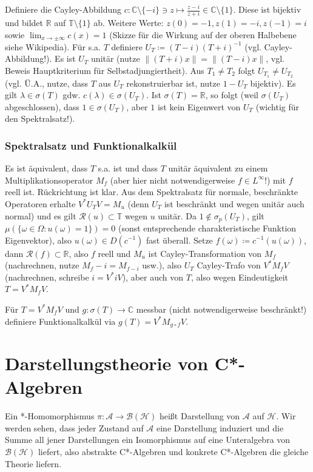 \documentclass[11pt,a4paper]{scrartcl}
\newcommand{\R}{\mathbb{R}} %
\newcommand{\C}{\mathbb{C}} %
\newcommand{\Hc}{\mathcal{H}}
\newcommand{\A}{\mathcal{A}}
\newcommand{\B}{\mathcal{B}}
\newcommand{\Rc}{\mathcal{R}}
\theoremstyle{plain}
\theoremstyle{definition}
\theoremstyle{remark}
\begin{document}
Definiere die Cayley-Abbildung $c: \C\setminus \{-i\} \ni z \mapsto \frac{z-i}{z+i} \in \C\setminus \{1\}$. Diese ist bijektiv und bildet $\R$ auf $\mathbb{T} \setminus \{1\}$ ab. Weitere Werte: $z(0)=-1, z(1)=-i, z(-1)=i$ sowie $\lim_{x\to \pm \infty} c(x) = 1$ (Skizze für die Wirkung auf der oberen Halbebene siehe Wikipedia). Für s.a. $T$ definiere $U_T\coloneqq (T-i)(T+i)^{-1}$ (vgl. Cayley-Abbildung!). Es ist $U_T$ unitär (nutze $\|(T+i)x\|=\|(T-i)x\|$, vgl. Beweis Hauptkriterium für Selbstadjungiertheit). Aus $T_1\neq T_2$ folgt $U_{T_1}\neq U_{T_2}$ (vgl. Ü.A., nutze, dass $T$ aus $U_T$ rekonstruierbar ist, nutze $1-U_T$ bijektiv). Es gilt $\lambda\in \sigma(T)$ gdw. $c(\lambda)\in \sigma(U_T)$. Ist $\sigma(T)=\R$, so folgt (weil $\sigma(U_T)$ abgeschlossen), dass $1\in \sigma(U_T)$, aber $1$ ist kein Eigenwert von $U_T$ (wichtig für den Spektralsatz!).

\subsubsection{Spektralsatz und Funktionalkalkül}

Es ist äquivalent, dass $T$ s.a. ist und dass $T$ unitär äquivalent zu einem Multiplikationsoperator $M_f$ (aber hier nicht notwendigerweise $f\in L^\infty$!) mit $f$ reell ist. Rückrichtung ist klar. Aus dem Spektralsatz für normale, beschränkte Operatoren erhalte $V^*U_TV=M_u$ (denn $U_T$ ist beschränkt und wegen unitär auch normal) und es gilt $\Rc(u)\subset \mathbb T$ wegen $u$ unitär. Da $1\not\in \sigma_p(U_T)$, gilt $\mu(\{\omega\in \Omega: u(\omega)=1\})=0$ (sonst entsprechende charakteristische Funktion Eigenvektor), also $u(\omega)\in D(c^{-1})$ fast überall. Setze $f(\omega)\coloneqq c^{-1}(u(\omega))$, dann $\Rc(f) \subset \R$, also $f$ reell und $M_u$ ist Cayley-Transformation von $M_f$ (nachrechnen, nutze $M_f-i=M_{f-i}$ usw.), also $U_T$ Cayley-Trafo von $V^*M_fV$ (nachrechnen, schreibe $i=V^*iV$), aber auch von $T$, also wegen Eindeutigkeit $T=V^*M_fV$.

Für $T=V^*M_fV$ und $g:\sigma(T)\to \C$ messbar (nicht notwendigerweise beschränkt!) definiere Funktionalkalkül via $g(T)=V^*M_{g\circ f}V$.

\section{Darstellungstheorie von C*-Algebren}

Ein *-Homomorphismus $\pi: \A\to \B(\Hc)$ heißt Darstellung von $\A$ auf $\Hc$. Wir werden sehen, dass jeder Zustand auf $\A$ eine Darstellung induziert und die Summe all jener Darstellungen ein Isomorphismus auf eine Unteralgebra von $\B(\Hc)$ liefert, also abstrakte C*-Algebren und konkrete C*-Algebren die gleiche Theorie liefern.
\end{document}
